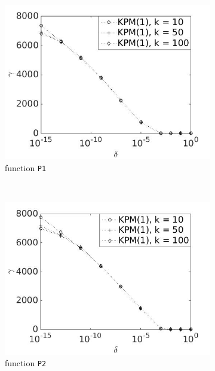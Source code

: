 \begin{figure}[H]
        \centering
        \begin{subfigure}[b]{0.45\textwidth}
                \includegraphics[width=\textwidth]{fig/s20antvstol1k}
                \caption{function \texttt{P1}}
                \label{fig:anttol1k}
        \end{subfigure}
~
        \begin{subfigure}[b]{0.45\textwidth}
                \includegraphics[width=\textwidth]{fig/s21antvstol2k}
                \caption{ function \texttt{P2}}
                \label{fig:anttol2k}
        \end{subfigure}
                \begin{subfigure}[b]{0.45\textwidth}

\end{subfigure}
\end{figure}
